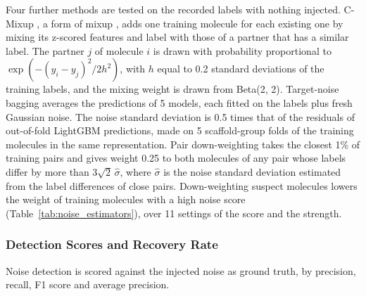 Four further methods are tested on the recorded labels with nothing injected. C-Mixup \citep{yao2022cmixup}, a form of mixup \citep{Zhang2018mixup}, adds one training molecule for each existing one by mixing its z-scored features and label with those of a partner that has a similar label. The partner $j$ of molecule $i$ is drawn with probability proportional to $\exp(-(y_i-y_j)^2/2h^2)$, with $h$ equal to 0.2 standard deviations of the training labels, and the mixing weight is drawn from Beta(2, 2). Target-noise bagging averages the predictions of 5 models, each fitted on the labels plus fresh Gaussian noise. The noise standard deviation is 0.5 times that of the residuals of out-of-fold LightGBM predictions, made on 5 scaffold-group folds of the training molecules in the same representation. Pair down-weighting takes the closest 1\% of training pairs and gives weight 0.25 to both molecules of any pair whose labels differ by more than $3\sqrt{2}\,\hat\sigma$, where $\hat\sigma$ is the noise standard deviation estimated from the label differences of close pairs. Down-weighting suspect molecules lowers the weight of training molecules with a high noise score (Table~\ref{tab:noise_estimators}), over 11 settings of the score and the strength.

\subsubsection{Detection Scores and Recovery Rate}

Noise detection is scored against the injected noise as ground truth, by precision, recall, F1 score and average precision.


